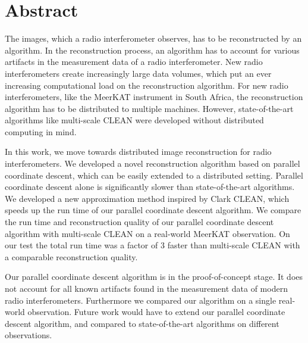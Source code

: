 \section*{Abstract}
The images, which a radio interferometer observes, has to be reconstructed by an algorithm. In the reconstruction process, an algorithm has to account for various artifacts in the measurement data of a radio interferometer. New radio interferometers create increasingly large data volumes, which put an ever increasing computational load on the reconstruction algorithm. For new radio interferometers, like the MeerKAT instrument in South Africa, the reconstruction algorithm has to be distributed to multiple machines. However, state-of-the-art algorithms like multi-scale CLEAN were developed without distributed computing in mind.

In this work, we move towards distributed image reconstruction for radio interferometers. We developed a novel reconstruction algorithm based on parallel coordinate descent, which can be easily extended to a distributed setting. Parallel coordinate descent alone is significantly slower than state-of-the-art algorithms. We developed a new approximation method inspired by Clark CLEAN, which speeds up the run time of our parallel coordinate descent algorithm. We compare the run time and reconstruction quality of our parallel coordinate descent algorithm with multi-scale CLEAN on a real-world MeerKAT observation. On our test the total run time was a factor of 3 faster than multi-scale CLEAN with a comparable reconstruction quality.

Our parallel coordinate descent algorithm is in the proof-of-concept stage. It does not account for all known artifacts found in the measurement data of modern radio interferometers. Furthermore we compared our algorithm on a single real-world observation. Future work would have to extend our parallel coordinate descent algorithm, and compared to state-of-the-art algorithms on different observations.



